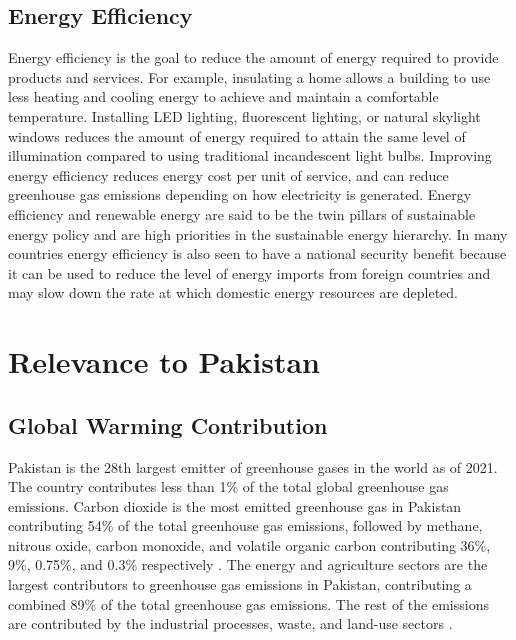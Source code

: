 \documentclass{article}
\begin{document}
\subsection{Energy Efficiency}
Energy efficiency is the goal to reduce the amount of energy required to
provide products and services. For example, insulating a home allows a building
to use less heating and cooling energy to achieve and maintain a comfortable
temperature. Installing LED lighting, fluorescent lighting, or natural skylight
windows reduces the amount of energy required to attain the same level of
illumination compared to using traditional incandescent light bulbs. Improving
energy efficiency reduces energy cost per unit of service, and can reduce
greenhouse gas emissions depending on how electricity is generated. Energy
efficiency and renewable energy are said to be the twin pillars of sustainable
energy policy and are high priorities in the sustainable energy hierarchy. In
many countries energy efficiency is also seen to have a national security
benefit because it can be used to reduce the level of energy imports from
foreign countries and may slow down the rate at which domestic energy resources
are depleted.

\section{Relevance to Pakistan}
\subsection{Global Warming Contribution}
Pakistan is the 28th largest emitter of greenhouse gases in the world as of
2021\cite{Ritchie_Roser_Rosado}. The country contributes less than 1\% of the
total global greenhouse gas emissions. Carbon dioxide is the most emitted
greenhouse gas in Pakistan contributing 54\% of the total greenhouse gas
emissions, followed by methane, nitrous oxide, carbon monoxide, and volatile
organic carbon contributing 36\%, 9\%, 0.75\%, and 0.3\% respectively
\cite{hussain2019comprehensive}. The energy and agriculture sectors are the
largest contributors to greenhouse gas emissions in Pakistan, contributing a
combined 89\% of the total greenhouse gas emissions. The rest of the emissions
are contributed by the industrial processes, waste, and land-use sectors
\cite{mir2017sectoral}.
\end{document}

